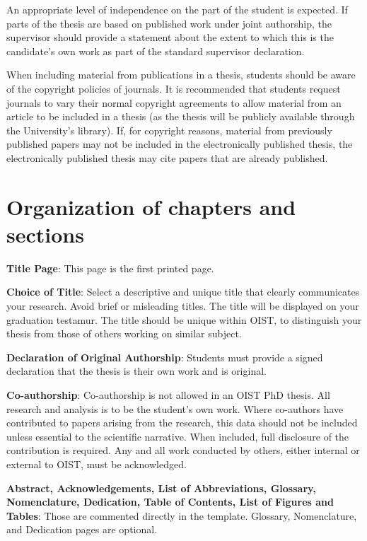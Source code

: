 An appropriate level of independence on the part of the student is expected.  If parts of the thesis are based on published work under joint authorship, the supervisor should provide a statement about the extent to which this is the candidate’s own work as part of the standard supervisor declaration.

When including material from publications in a thesis, students should be aware of the copyright policies of journals.  It is recommended that students request journals to vary their normal copyright agreements to allow material from an article to be included in a thesis (as the thesis will be publicly available through the University’s library).  If, for copyright reasons, material from previously published papers may not be included in the electronically published thesis, the electronically published thesis may cite papers that are already published.

\section{Organization of chapters and sections}

\textbf{Title Page}: This page is the first printed page.

\textbf{Choice of Title}: Select a descriptive and unique title that clearly communicates your research.  Avoid brief or misleading titles.  The title will be displayed on your graduation testamur.  The title should be unique within OIST, to distinguish your thesis from those of others working on similar subject.

\textbf{Declaration of Original Authorship}:  Students must provide a signed declaration that the thesis is their own work and is original.

\textbf{Co-authorship}: Co-authorship is not allowed in an OIST PhD thesis.  All research and analysis is to be the student’s own work.  Where co-authors have contributed to papers arising from the research, this data should not be included unless essential to the scientific narrative.  When included, full disclosure of the contribution is required.  Any and all work conducted by others, either internal or external to OIST, must be acknowledged.

\textbf{Abstract, Acknowledgements, List of Abbreviations, Glossary, Nomenclature, Dedication, Table of Contents, List of Figures and Tables}: Those are commented directly in the template. Glossary, Nomenclature, and Dedication pages are optional.

